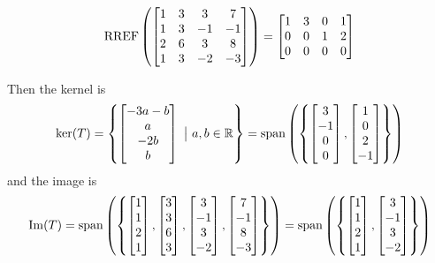 \documentclass{sbgLAquiz}
\begin{document}
\begin{solution}

$$\operatorname{RREF}\left(\begin{bmatrix} 1 & 3 & 3 & 7 \\ 1 & 3 & -1 & -1 \\ 2 & 6 & 3 & 8 \\ 1 & 3 & -2 & -3 \end{bmatrix}\right) = \begin{bmatrix} 1 & 3 & 0 & 1 \\ 0 & 0 & 1 & 2 \\ 0 & 0 & 0 & 0 \end{bmatrix}$$

Then the kernel is
$$\ker(T) = \left\{ \begin{bmatrix} -3a-b \\ a \\ -2b \\ b \end{bmatrix}\ \big|\ a,b \in \mathbb{R}\right\} = {\rm span}\left(\left\{ \begin{bmatrix} 3 \\ -1 \\ 0 \\ 0 \end{bmatrix} , \begin{bmatrix} 1\\0 \\ 2 \\ -1 \end{bmatrix} \right\} \right)$$
and the image is 
$${\rm Im}(T) = {\rm span} \left( \left\{ \begin{bmatrix} 1 \\ 1 \\ 2 \\ 1 \end{bmatrix} , \begin{bmatrix} 3 \\ 3 \\ 6 \\ 3 \end{bmatrix}, \begin{bmatrix} 3 \\ -1 \\ 3 \\ -2 \end{bmatrix}, \begin{bmatrix} 7 \\ -1 \\ 8 \\ -3 \end{bmatrix} \right\} \right) = {\rm span} \left( \left\{ \begin{bmatrix} 1 \\ 1 \\ 2 \\ 1 \end{bmatrix} , \begin{bmatrix} 3 \\ -1 \\ 3 \\ -2 \end{bmatrix}\right\} \right)$$
\end{solution}
\end{document}
